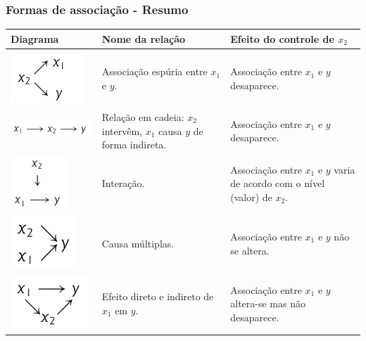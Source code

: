 \documentclass[graphics,14pt]{beamer}
\begin{document}
\begin{frame}[t,fragile=singleslide]
\frametitle{Formas de associação - Resumo}

\begin{table}[]
	\centering
	\begin{tabularx}{31cm}{|C{6cm} L{9cm} L{13cm}|}
		\hline
		 Diagrama & Nome da relação                       & Efeito do controle de $x_2$                                                \\ \hline
		\includegraphics[height=2cm]{Cap_10_Espuria.png} 
		 & Associação espúria entre $x_1$ e $y$. & Associação entre $x_1$ e $y$ desaparece.                                   \\
		\includegraphics[height=1.25cm]{Cap_10_Cadeia.jpg} 
		& Relação em cadeia: $x_2$ intervêm, $x_1$ causa $y$ de forma indireta. & Associação entre $x_1$ e $y$ desaparece.                   \\
		\includegraphics[height=2cm]{Cap_10_Interacao.jpg} 
		& Interação.                            & Associação entre $x_1$ e $y$ varia de acordo com o nível (valor) de $x_2$. \\
		\includegraphics[height=2cm]{Cap_10_Causas_Multiplas.jpg} 
		& Causa múltiplas.                      & Associação entre $x_1$ e $y$ não se altera.                                \\
		\includegraphics[height=2cm]{Cap_10_Efeitos_Diretos_indiretos.jpg} 
		& Efeito direto e indireto de $x_1$ em $y$.                             & Associação entre $x_1$ e $y$ altera-se mas não desaparece. \\ \hline
	\end{tabularx}
\end{table}

\end{frame}
\end{document}
